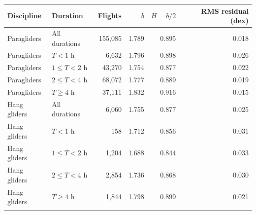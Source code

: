 \begin{tabular}{@{}llrrrr@{}}
\toprule
Discipline & Duration & Flights & $b$ & $H=b/2$ & RMS residual (dex) \\
\midrule
Paragliders & All durations & 155,085 & 1.789 & 0.895 & 0.018 \\
Paragliders & $T<1$ h & 6,632 & 1.796 & 0.898 & 0.026 \\
Paragliders & $1\le T<2$ h & 43,270 & 1.754 & 0.877 & 0.022 \\
Paragliders & $2\le T<4$ h & 68,072 & 1.777 & 0.889 & 0.019 \\
Paragliders & $T\ge4$ h & 37,111 & 1.832 & 0.916 & 0.015 \\
\addlinespace
Hang gliders & All durations & 6,060 & 1.755 & 0.877 & 0.025 \\
Hang gliders & $T<1$ h & 158 & 1.712 & 0.856 & 0.031 \\
Hang gliders & $1\le T<2$ h & 1,204 & 1.688 & 0.844 & 0.033 \\
Hang gliders & $2\le T<4$ h & 2,854 & 1.736 & 0.868 & 0.030 \\
Hang gliders & $T\ge4$ h & 1,844 & 1.798 & 0.899 & 0.021 \\
\addlinespace
\bottomrule
\end{tabular}
